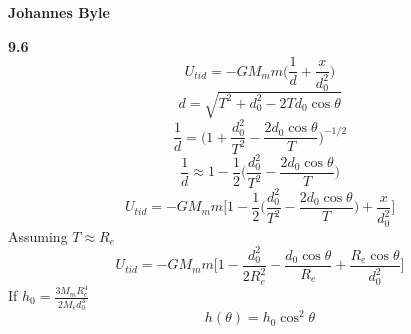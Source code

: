 \documentclass[english]{article}
\begin{document}
\begin{multicols*}{2}
\textbf{Johannes Byle}\\
\newcommand{\Lagr}{\mathcal{L}}

\noindent
\textbf{9.6}
$$U_{tid}=-GM_mm\Big(\frac{1}{d}+\frac{x}{d_0^2}\Big)$$
$$d=\sqrt{T^2+d_0^2-2Td_0\cos\theta}$$
$$\frac{1}{d}=\Big(1+\frac{d_0^2}{T^2}-\frac{2d_0\cos\theta}{T}\Big)^{-1/2}$$
$$\frac{1}{d}\approx 1-\frac{1}{2}\Big(\frac{d_0^2}{T^2}-\frac{2d_0\cos\theta}{T}\Big)$$
$$U_{tid}=-GM_mm\Big[1-\frac{1}{2}\Big(\frac{d_0^2}{T^2}-\frac{2d_0\cos\theta}{T}\Big)+\frac{x}{d_0^2}\Big]$$
Assuming $T\approx R_e$
$$U_{tid}=-GM_mm\Big[1-\frac{d_0^2}{2R_e^2}-\frac{d_0\cos\theta}{R_e}+\frac{R_e\cos\theta}{d_0^2}\Big]$$
If $h_0=\frac{3M_mR_e^4}{2M_ed_0^3}$
$$h(\theta)=h_0\cos^2\theta$$
\end{multicols*}
\end{document}
